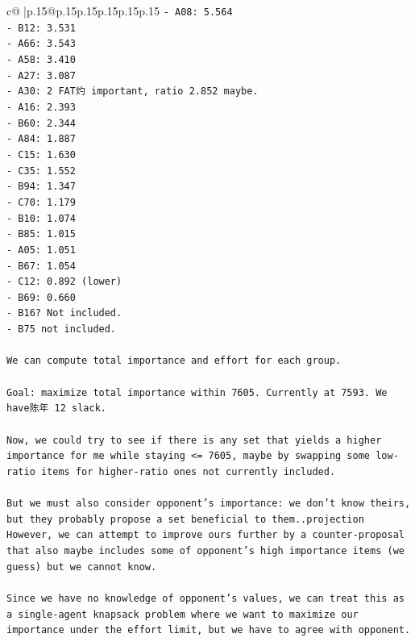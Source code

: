 \documentclass{article}
\begin{document}
{\begin{supertabular}{c@{$\;$}|p{.15\linewidth}@{}p{.15\linewidth}p{.15\linewidth}p{.15\linewidth}p{.15\linewidth}p{.15\linewidth}}
{{{\texttt{{-} A08: 5.564} \\
\texttt{{-} B12: 3.531} \\
\texttt{{-} A66: 3.543} \\
\texttt{{-} A58: 3.410} \\
\texttt{{-} A27: 3.087} \\
\texttt{{-} A30: 2 FAT灼 important, ratio 2.852 maybe.} \\
\texttt{{-} A16: 2.393} \\
\texttt{{-} B60: 2.344} \\
\texttt{{-} A84: 1.887} \\
\texttt{{-} C15: 1.630} \\
\texttt{{-} C35: 1.552} \\
\texttt{{-} B94: 1.347} \\
\texttt{{-} C70: 1.179} \\
\texttt{{-} B10: 1.074} \\
\texttt{{-} B85: 1.015} \\
\texttt{{-} A05: 1.051} \\
\texttt{{-} B67: 1.054} \\
\texttt{{-} C12: 0.892 (lower)} \\
\texttt{{-} B69: 0.660} \\
\texttt{{-} B16? Not included.} \\
\texttt{{-} B75 not included.} \\
\\ 
\texttt{We can compute total importance and effort for each group.} \\
\\ 
\texttt{Goal: maximize total importance within 7605. Currently at 7593. We have陈年 12 slack.} \\
\\ 
\texttt{Now, we could try to see if there is any set that yields a higher importance for me while staying <= 7605, maybe by swapping some low{-}ratio items for higher{-}ratio ones not currently included.} \\
\\ 
\texttt{But we must also consider opponent's importance: we don't know theirs, but they probably propose a set beneficial to them..projection However, we can attempt to improve ours further by a counter{-}proposal that also maybe includes some of opponent's high importance items (we guess) but we cannot know.} \\
\\ 
\texttt{Since we have no knowledge of opponent's values, we can treat this as a single{-}agent knapsack problem where we want to maximize our importance under the effort limit, but we have to agree with opponent.} \\
}}}
\end{supertabular}}
\end{document}
